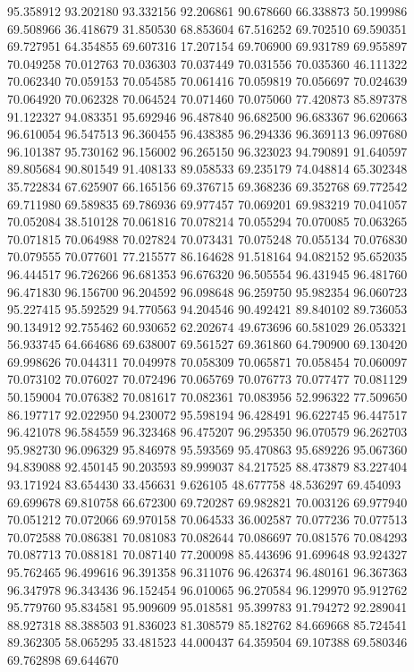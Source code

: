95.358912
93.202180
93.332156
92.206861
90.678660
66.338873
50.199986
69.508966
36.418679
31.850530
68.853604
67.516252
69.702510
69.590351
69.727951
64.354855
69.607316
17.207154
69.706900
69.931789
69.955897
70.049258
70.012763
70.036303
70.037449
70.031556
70.035360
46.111322
70.062340
70.059153
70.054585
70.061416
70.059819
70.056697
70.024639
70.064920
70.062328
70.064524
70.071460
70.075060
77.420873
85.897378
91.122327
94.083351
95.692946
96.487840
96.682500
96.683367
96.620663
96.610054
96.547513
96.360455
96.438385
96.294336
96.369113
96.097680
96.101387
95.730162
96.156002
96.265150
96.323023
94.790891
91.640597
89.805684
90.801549
91.408133
89.058533
69.235179
74.048814
65.302348
35.722834
67.625907
66.165156
69.376715
69.368236
69.352768
69.772542
69.711980
69.589835
69.786936
69.977457
70.069201
69.983219
70.041057
70.052084
38.510128
70.061816
70.078214
70.055294
70.070085
70.063265
70.071815
70.064988
70.027824
70.073431
70.075248
70.055134
70.076830
70.079555
70.077601
77.215577
86.164628
91.518164
94.082152
95.652035
96.444517
96.726266
96.681353
96.676320
96.505554
96.431945
96.481760
96.471830
96.156700
96.204592
96.098648
96.259750
95.982354
96.060723
95.227415
95.592529
94.770563
94.204546
90.492421
89.840102
89.736053
90.134912
92.755462
60.930652
62.202674
49.673696
60.581029
26.053321
56.933745
64.664686
69.638007
69.561527
69.361860
64.790900
69.130420
69.998626
70.044311
70.049978
70.058309
70.065871
70.058454
70.060097
70.073102
70.076027
70.072496
70.065769
70.076773
70.077477
70.081129
50.159004
70.076382
70.081617
70.082361
70.083956
52.996322
77.509650
86.197717
92.022950
94.230072
95.598194
96.428491
96.622745
96.447517
96.421078
96.584559
96.323468
96.475207
96.295350
96.070579
96.262703
95.982730
96.096329
95.846978
95.593569
95.470863
95.689226
95.067360
94.839088
92.450145
90.203593
89.999037
84.217525
88.473879
83.227404
93.171924
83.654430
33.456631
9.626105
48.677758
48.536297
69.454093
69.699678
69.810758
66.672300
69.720287
69.982821
70.003126
69.977940
70.051212
70.072066
69.970158
70.064533
36.002587
70.077236
70.077513
70.072588
70.086381
70.081083
70.082644
70.086697
70.081576
70.084293
70.087713
70.088181
70.087140
77.200098
85.443696
91.699648
93.924327
95.762465
96.499616
96.391358
96.311076
96.426374
96.480161
96.367363
96.347978
96.343436
96.152454
96.010065
96.270584
96.129970
95.912762
95.779760
95.834581
95.909609
95.018581
95.399783
91.794272
92.289041
88.927318
88.388503
91.836023
81.308579
85.182762
84.669668
85.724541
89.362305
58.065295
33.481523
44.000437
64.359504
69.107388
69.580346
69.762898
69.644670
